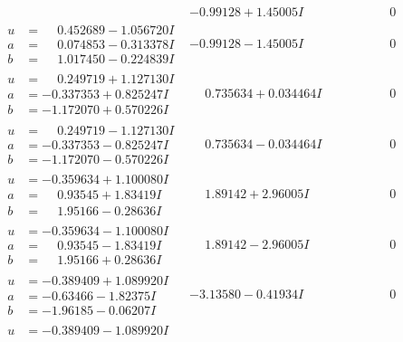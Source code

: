 \documentclass[1p]{elsarticle_modified}
\theoremstyle{definition}
\begin{document}
$$\begin{array}{c|c|c}
 & -0.99128 + 1.45005 I & \phantom{-0.000000 } 0 \\ \hline\begin{aligned}
u &= \phantom{-}0.452689 - 1.056720 I \\
a &= \phantom{-}0.074853 - 0.313378 I \\
b &= \phantom{-}1.017450 - 0.224839 I\end{aligned}
 & -0.99128 - 1.45005 I & \phantom{-0.000000 } 0 \\ \hline\begin{aligned}
u &= \phantom{-}0.249719 + 1.127130 I \\
a &= -0.337353 + 0.825247 I \\
b &= -1.172070 + 0.570226 I\end{aligned}
 & \phantom{-}0.735634 + 0.034464 I & \phantom{-0.000000 } 0 \\ \hline\begin{aligned}
u &= \phantom{-}0.249719 - 1.127130 I \\
a &= -0.337353 - 0.825247 I \\
b &= -1.172070 - 0.570226 I\end{aligned}
 & \phantom{-}0.735634 - 0.034464 I & \phantom{-0.000000 } 0 \\ \hline\begin{aligned}
u &= -0.359634 + 1.100080 I \\
a &= \phantom{-}0.93545 + 1.83419 I \\
b &= \phantom{-}1.95166 - 0.28636 I\end{aligned}
 & \phantom{-}1.89142 + 2.96005 I & \phantom{-0.000000 } 0 \\ \hline\begin{aligned}
u &= -0.359634 - 1.100080 I \\
a &= \phantom{-}0.93545 - 1.83419 I \\
b &= \phantom{-}1.95166 + 0.28636 I\end{aligned}
 & \phantom{-}1.89142 - 2.96005 I & \phantom{-0.000000 } 0 \\ \hline\begin{aligned}
u &= -0.389409 + 1.089920 I \\
a &= -0.63466 - 1.82375 I \\
b &= -1.96185 - 0.06207 I\end{aligned}
 & -3.13580 - 0.41934 I & \phantom{-0.000000 } 0 \\ \hline\begin{aligned}
u &= -0.389409 - 1.089920 I \\

\end{aligned}
\end{array}$$
\end{document}

